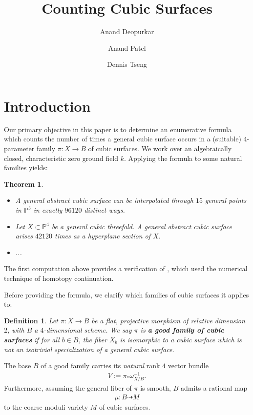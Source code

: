 \documentclass[12 pt]{amsart}
\title{Counting Cubic Surfaces}
\author{Anand Deopurkar \and Anand Patel \and Dennis Tseng}
\newtheorem{theorem}{Theorem}[section]
\newtheorem{definition}{Definition}[section]
\renewcommand{\P}{\mathbb{P}}
\newcommand{\<}{\left\langle}
\renewcommand{\>}{\right\rangle}
\begin{document}
\maketitle


\section{Introduction}
\label{sec:intro}
Our primary objective in this paper is to determine an enumerative
formula which counts the number of times a general cubic surface
occurs in a (suitable) $4$-parameter family $ \pi: X \to B$ of cubic
surfaces.  We work over an algebraically closed, characteristic zero
ground field $k$.  Applying the formula to some natural families
yields:

\begin{theorem}
  \begin{itemize}
  \item[(A)] A general abstract cubic surface can be interpolated
    through $15$ general points in $\P^3$ in exactly $96120$ distinct
    ways.
  \item[(B)] Let $X \subset \P^{4}$ be a general cubic
    threefold. A general abstract cubic surface arises $42120$ times
    as a hyperplane section of $X$.
    \item[(C)]... 
    \end{itemize}
\end{theorem}

The first computation above provides a verification of \cite{}, which
used the numerical technique of homotopy continuation.

Before providing the formula, we clarify which families of
cubic surfaces it applies to:

\begin{definition}
\label{def:goodfamily}
Let $\pi :X \to B$ be a flat, projective morphism of relative
dimension $2$, with $B$ a $4$-dimensional scheme. We say $\pi$ is {\bf
  a good family of cubic surfaces} if for all $b \in B$, the fiber
$X_{b}$ is isomorphic to a cubic surface which is not an isotrivial
specialization of a general cubic surface.
\end{definition}

The base $B$ of a good family carries its {\sl natural} rank $4$
vector bundle
\begin{align}
  \label{eq:V}
  V := \pi_{*}\omega_{X/B}^{-1}.
\end{align}
Furthermore, assuming the general fiber of $\pi$ is smooth, $B$ admits
a rational map
\begin{align}
  \label{eq:mu}
  \mu: B \dashrightarrow M
\end{align}
to the coarse moduli variety $M$ of cubic surfaces.
\end{document}
